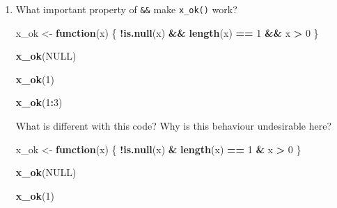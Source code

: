 \documentclass[]{book}
\newenvironment{Shaded}{\begin{snugshade}}{\end{snugshade}}
\newcommand{\ControlFlowTok}[1]{\textcolor[rgb]{0.13,0.29,0.53}{\textbf{#1}}}
\newcommand{\DecValTok}[1]{\textcolor[rgb]{0.00,0.00,0.81}{#1}}
\newcommand{\KeywordTok}[1]{\textcolor[rgb]{0.13,0.29,0.53}{\textbf{#1}}}
\newcommand{\NormalTok}[1]{#1}
\newcommand{\OperatorTok}[1]{\textcolor[rgb]{0.81,0.36,0.00}{\textbf{#1}}}
\newcommand{\OtherTok}[1]{\textcolor[rgb]{0.56,0.35,0.01}{#1}}
\newcommand{\StringTok}[1]{\textcolor[rgb]{0.31,0.60,0.02}{#1}}
\theoremstyle{definition}
\theoremstyle{definition}
\theoremstyle{definition}
\theoremstyle{remark}
\begin{document}
\begin{enumerate}
\def\labelenumi{\arabic{enumi}.}
\item
  What important property of \texttt{\&\&} make \texttt{x\_ok()} work?

\begin{Shaded}
\begin{Highlighting}[]
\NormalTok{x_ok <-}\StringTok{ }\ControlFlowTok{function}\NormalTok{(x) \{}
  \OperatorTok{!}\KeywordTok{is.null}\NormalTok{(x) }\OperatorTok{&&}\StringTok{ }\KeywordTok{length}\NormalTok{(x) }\OperatorTok{==}\StringTok{ }\DecValTok{1} \OperatorTok{&&}\StringTok{ }\NormalTok{x }\OperatorTok{>}\StringTok{ }\DecValTok{0}
\NormalTok{\}}

\KeywordTok{x_ok}\NormalTok{(}\OtherTok{NULL}\NormalTok{)}
\end{Highlighting}
\end{Shaded}

\begin{Shaded}
\begin{Highlighting}[]
\KeywordTok{x_ok}\NormalTok{(}\DecValTok{1}\NormalTok{)}
\end{Highlighting}
\end{Shaded}

\begin{Shaded}
\begin{Highlighting}[]
\KeywordTok{x_ok}\NormalTok{(}\DecValTok{1}\OperatorTok{:}\DecValTok{3}\NormalTok{)}
\end{Highlighting}
\end{Shaded}

  What is different with this code? Why is this behaviour undesirable
  here?

\begin{Shaded}
\begin{Highlighting}[]
\NormalTok{x_ok <-}\StringTok{ }\ControlFlowTok{function}\NormalTok{(x) \{}
  \OperatorTok{!}\KeywordTok{is.null}\NormalTok{(x) }\OperatorTok{&}\StringTok{ }\KeywordTok{length}\NormalTok{(x) }\OperatorTok{==}\StringTok{ }\DecValTok{1} \OperatorTok{&}\StringTok{ }\NormalTok{x }\OperatorTok{>}\StringTok{ }\DecValTok{0}
\NormalTok{\}}

\KeywordTok{x_ok}\NormalTok{(}\OtherTok{NULL}\NormalTok{)}
\end{Highlighting}
\end{Shaded}

\begin{Shaded}
\begin{Highlighting}[]
\KeywordTok{x_ok}\NormalTok{(}\DecValTok{1}\NormalTok{)}
\end{Highlighting}
\end{Shaded}


\end{enumerate}
\end{document}
